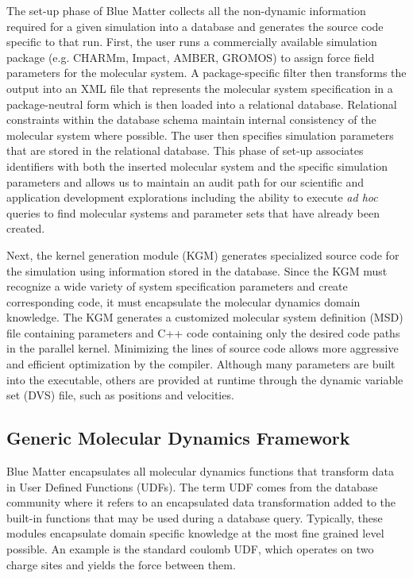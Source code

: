 \documentclass[doublespacing]{elsart}
\begin{document}
The set-up phase of Blue Matter collects all the non-dynamic
information required for a given simulation into a database and
generates the source code specific to that run.  First, the user runs
a commercially available simulation package
(e.g. CHARMm\cite{charmm:1998}, Impact\cite{impact},
AMBER\cite{amber:2002}, GROMOS\cite{gromos:1996}) to assign force
field parameters for the molecular system.  A package-specific filter
then transforms the output into an XML file that represents the
molecular system specification in a package-neutral form which is then
loaded into a relational database.  Relational constraints within the
database schema maintain internal consistency of the molecular system
where possible.  The user then specifies simulation parameters that
are stored in the relational database.  This phase of set-up
associates identifiers with both the inserted molecular system and the
specific simulation parameters and allows us to maintain an audit
path for our scientific and application development explorations
including the ability to execute {\em ad hoc} queries to find
molecular systems and parameter sets that have already been created.

Next, the kernel generation module (KGM) generates specialized source
code for the simulation using information stored in the database.
Since the KGM must recognize a wide variety of system specification
parameters and create corresponding code, it must encapsulate the
molecular dynamics domain knowledge.  The KGM generates a customized
molecular system definition (MSD) file containing parameters and
C++ code containing only the desired code paths in the
parallel kernel.  Minimizing the lines of source code allows more
aggressive and efficient optimization by the compiler.  Although many
parameters are built into the executable, others are provided at
runtime through the dynamic variable set (DVS) file, such as positions
and velocities.

\subsection{Generic Molecular Dynamics Framework}

Blue Matter encapsulates all molecular dynamics functions that
transform data in User Defined Functions (UDFs). The term UDF comes
from the database community where it refers to an encapsulated data
transformation added to the built-in functions that may be used during
a database query. Typically, these modules encapsulate domain specific
knowledge at the most fine grained level possible.  An example is the
standard coulomb UDF, which operates on two charge sites and yields
the force between them.
\end{document}
